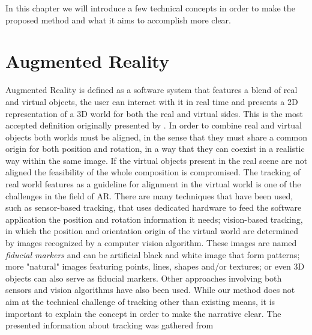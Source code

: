 
In this chapter we will introduce a few technical concepts in order to make the proposed method and what it aims to accomplish more clear.

\section{Augmented Reality}
Augmented Reality is defined as a software system that features a blend of real and virtual objects, the user can interact with it in real time and presents a 2D representation of a 3D world for both the real and virtual sides. This is the most accepted definition originally presented by \cite{azuma1997}. \newline
In order to combine real and virtual objects both worlds must be aligned, in the sense that they must share a common origin for both position and rotation, in a way that they can coexist in a realistic way within the same image. If the virtual objects present in the real scene are not aligned the feasibility of the whole composition is compromised. The tracking of real world features as a guideline for alignment in the virtual world is one of the challenges in the field of AR. There are many techniques that have been used, such as sensor-based tracking, that uses dedicated hardware to feed the software application the position and rotation information it needs; vision-based tracking, in which the position and orientation origin of the virtual world are determined by images recognized by a computer vision algorithm. These images are named \emph{fiducial markers} and can be artificial black and white image that form patterns; more "natural" images featuring points, lines, shapes and/or textures; or even 3D objects can also serve as fiducial markers. Other approaches involving both sensors and vision algorithms have also been used. 
While our method does not aim at the technical challenge of tracking other than existing means, it is important to explain the concept in order to make the narrative clear. The presented information about tracking was gathered from \cite{zhou2008}

